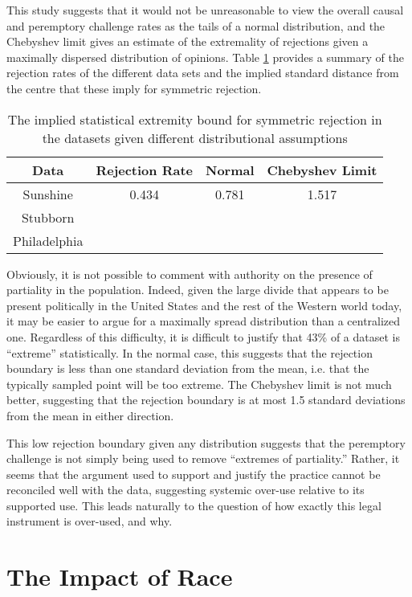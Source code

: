 This study suggests that it would not be unreasonable to view the overall causal and peremptory challenge rates as the tails of a
normal distribution, and the Chebyshev limit gives an estimate of the extremality of rejections given a maximally dispersed
distribution of opinions. Table \ref{tab:rejbounds} provides a summary of the rejection rates of the different data sets and the
implied standard distance from the centre that these imply for symmetric rejection.

\begin{table}
  \centering
  \label{tab:rejbounds}
  \caption[Implied Rejection Boundaries]{The implied statistical extremity bound for symmetric rejection in the datasets given
    different distributional assumptions}
  \begin{tabular}{|c|c|c|c|} \hline
    Data & Rejection Rate & Normal & Chebyshev Limit \\ \hline
    Sunshine & 0.434 & 0.781 & 1.517 \\
    Stubborn & & & \\
    Philadelphia & & & \\
    \hline
  \end{tabular}
\end{table}

Obviously, it is not possible to comment with authority on the presence of partiality in the population. Indeed, given the large
divide that appears to be present politically in the United States and the rest of the Western world today, it may be easier to
argue for a maximally spread distribution than a centralized one. Regardless of this difficulty, it is difficult to justify that
43\% of a dataset is ``extreme'' statistically. In the normal case, this suggests that the rejection boundary is less than one
standard deviation from the mean, i.e. that the typically sampled point will be too extreme. The Chebyshev limit is not much
better, suggesting that the rejection boundary is at most 1.5 standard deviations from the mean in either direction.

This low rejection boundary given any distribution suggests that the peremptory challenge is not simply being used to remove
``extremes of partiality.'' Rather, it seems that the argument used to support and justify the practice cannot be reconciled well
with the data, suggesting systemic over-use relative to its supported use. This leads naturally to the question of how exactly
this legal instrument is over-used, and why.

\section{The Impact of Race} \label{sec:impactrace}

